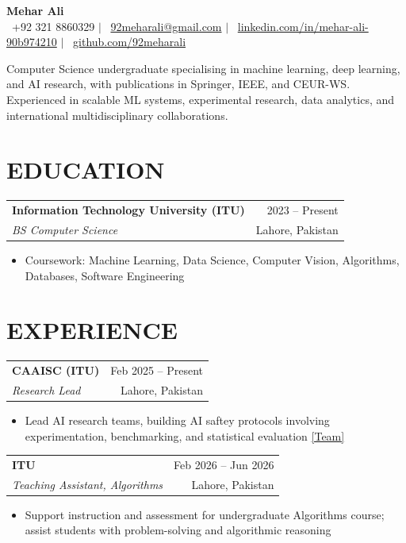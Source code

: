 \documentclass[letterpaper,9pt]{article}
\makeatletter
\newcommand{\resumeItem}[1]{
  \item \small{#1}
}
\newcommand{\resumeSubheading}[4]{
  \vspace{0pt}
  \begin{tabular*}{\textwidth}{l@{\extracolsep{\fill}}r}
    \textbf{\small #1} & {\color{dark-grey}\small #2} \\
    \textit{\small #3} & {\color{dark-grey}\small #4} \\
  \end{tabular*}
  \vspace{-5pt}
}
\makeatother
\begin{document}
\begin{center}
    {\LARGE \textbf{Mehar Ali}} \\ \vspace{3pt}
    \small
    \faPhone* \ +92 321 8860329 \hspace{4pt}$|$\hspace{4pt}
    \faEnvelope \ \href{mailto:92meharali@gmail.com}{92meharali@gmail.com} \hspace{4pt}$|$\hspace{4pt}
    \faLinkedin \ \href{https://www.linkedin.com/in/mehar-ali-90b974210}{linkedin.com/in/mehar-ali-90b974210} \hspace{4pt}$|$\hspace{4pt}
    \faGithub \ \href{https://github.com/92meharali}{github.com/92meharali}
\end{center}

\vspace{-8pt}
\small{Computer Science undergraduate specialising in machine learning, deep learning, and AI research, with publications in Springer, IEEE, and CEUR-WS. Experienced in scalable ML systems, experimental research, data analytics, and international multidisciplinary collaborations.}

\section{EDUCATION}
\resumeSubheading{Information Technology University (ITU)}{2023 -- Present}{BS Computer Science}{Lahore, Pakistan}
\begin{itemize}
\resumeItem{Coursework: Machine Learning, Data Science, Computer Vision, Algorithms, Databases, Software Engineering}
\end{itemize}

\section{EXPERIENCE}

\resumeSubheading{CAAISC (ITU)}{Feb 2025 -- Present}{Research Lead}{Lahore, Pakistan}
\begin{itemize}
\resumeItem{Lead AI research teams, building AI saftey protocols involving experimentation, benchmarking, and statistical evaluation \href{https://caaisc.itu.edu.pk/team}{[Team]}}
\end{itemize}

\resumeSubheading{ITU}{Feb 2026 -- Jun 2026}{Teaching Assistant, Algorithms}{Lahore, Pakistan}
\begin{itemize}
\resumeItem{Support instruction and assessment for undergraduate Algorithms course; assist students with problem-solving and algorithmic reasoning}
\end{itemize}
\end{document}
